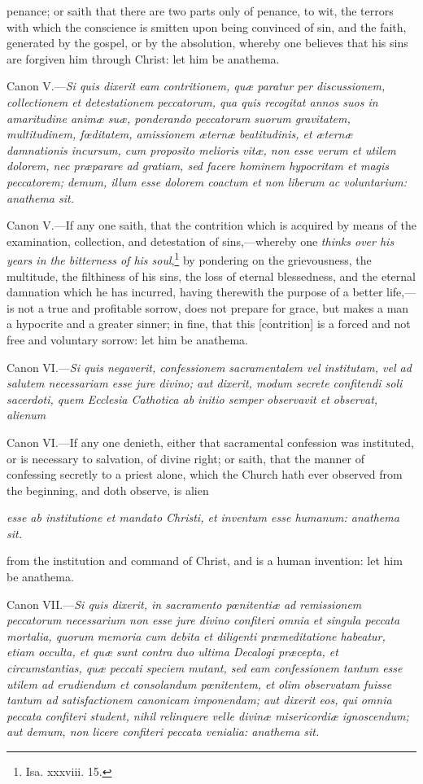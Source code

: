 penance; or saith that there are two parts only of penance, to wit, the terrors with which the conscience is smitten upon being convinced of sin, and the faith, generated by the gospel, or by the absolution, whereby one believes that his sins are forgiven him through Christ: let him be anathema.

Canon V.—\emph{Si quis dixerit eam contritionem, quæ paratur per discussionem, collectionem et detestationem peccatorum, qua quis recogitat annos suos in amaritudine animæ suæ, ponderando peccatorum suorum gravitatem, multitudinem, fœditatem, amissionem æternæ beatitudinis, et æternæ damnationis incursum, cum proposito melioris vitæ, non esse verum et utilem dolorem, nec præparare ad gratiam, sed facere hominem hypocritam et magis peccatorem; demum, illum esse dolorem coactum et non liberum ac voluntarium: anathema sit.}

Canon V.—If any one saith, that the contrition which is acquired by means of the examination, collection, and detestation of sins,—whereby one \emph{thinks over his years in the bitterness of his soul},\footnote{\par   Isa. xxxviii. 15.} by pondering on the grievousness, the multitude, the filthiness of his sins, the loss of eternal blessedness, and the eternal damnation which he has incurred, having therewith the purpose of a better life,—is not a true and profitable sorrow, does not prepare for grace, but makes a man a hypocrite and a greater sinner; in fine, that this [contrition] is a forced and not free and voluntary sorrow: let him be anathema.

Canon VI.—\emph{Si quis negaverit, confessionem sacramentalem vel institutam, vel ad salutem necessariam esse jure divino; aut dixerit, modum secrete confitendi soli sacerdoti, quem Ecclesia Cathotica ab initio semper observavit et observat, alienum }

Canon VI.—If any one denieth, either that sacramental confession was instituted, or is necessary to salvation, of divine right; or saith, that the manner of confessing secretly to a priest alone, which the Church hath ever observed from the beginning, and doth observe, is alien

\emph{esse ab institutione et mandato Christi, et inventum esse humanum: anathema sit.}

from the institution and command of Christ, and is a human invention: let him be anathema.

Canon VII.—\emph{Si quis dixerit, in sacramento pœnitentiæ ad remissionem peccatorum necessarium non esse jure divino confiteri omnia et singula peccata mortalia, quorum memoria cum debita et diligenti præmeditatione habeatur, etiam occulta, et quæ sunt contra duo ultima Decalogi præcepta, et circumstantias, quæ peccati speciem mutant, sed eam confessionem tantum esse utilem ad erudiendum et consolandum pœnitentem, et olim observatam fuisse tantum ad satisfactionem canonicam imponendam; aut dixerit eos, qui omnia peccata confiteri student, nihil relinquere velle divinæ misericordiæ ignoscendum; aut demum, non licere confiteri peccata venialia: anathema sit.}

